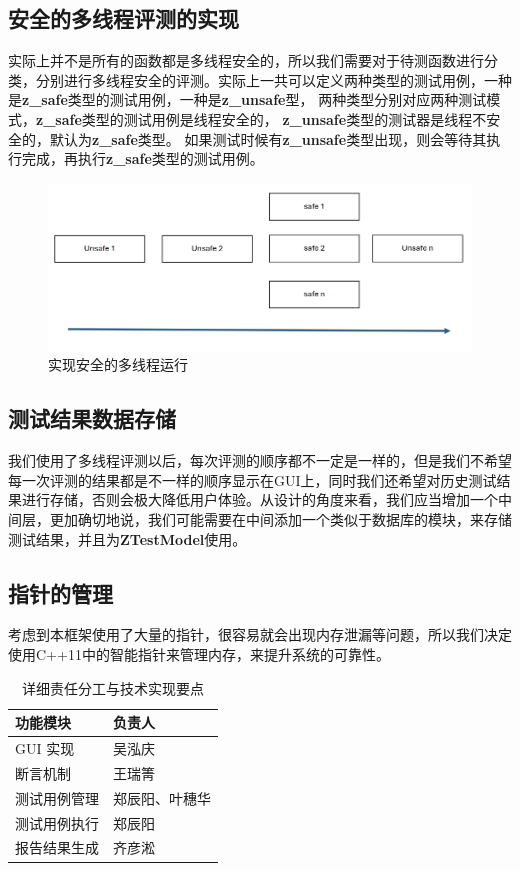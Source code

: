 \documentclass[chinese]{article}
\begin{document}
\subsection{安全的多线程评测的实现}
实际上并不是所有的函数都是多线程安全的，所以我们需要对于待测函数进行分类，分别进行多线程安全的评测。实际上一共可以定义两种类型的测试用例，一种是\textbf{z\_safe}类型的测试用例，一种是\textbf{z\_unsafe}型，
两种类型分别对应两种测试模式，\textbf{z\_safe}类型的测试用例是线程安全的，
\textbf{z\_unsafe}类型的测试器是线程不安全的，默认为\textbf{z\_safe}类型。
如果测试时候有\textbf{z\_unsafe}类型出现，则会等待其执行完成，再执行\textbf{z\_safe}类型的测试用例。
\begin{figure}[H]
    \centering
    \includegraphics[width=\textwidth]{img/run.png} %
    \caption{实现安全的多线程运行}
    \label{fig:diagram}
\end{figure}
\subsection{测试结果数据存储}
我们使用了多线程评测以后，每次评测的顺序都不一定是一样的，但是我们不希望每一次评测的结果都是不一样的顺序显示在GUI上，同时我们还希望对历史测试结果进行存储，否则会极大降低用户体验。从设计的角度来看，我们应当增加一个中间层，更加确切地说，我们可能需要在中间添加一个类似于数据库的模块，来存储测试结果，并且为\textbf{ZTestModel}使用。
\subsection{指针的管理}
考虑到本框架使用了大量的指针，很容易就会出现内存泄漏等问题，所以我们决定使用C++11中的智能指针来管理内存，来提升系统的可靠性。
\begin{table}[H]
    \centering
    \caption{详细责任分工与技术实现要点}
    \label{tab:division}
    \begin{tabularx}{\textwidth}{>{\centering\arraybackslash}m{3cm}>{\centering\arraybackslash}m{3cm}}
        \toprule
        \textbf{功能模块} & \textbf{负责人} \\
        \midrule
        GUI 实现        & 吴泓庆          \\
        断言机制          & 王瑞箐          \\
        测试用例管理        & 郑辰阳、叶穗华      \\
        测试用例执行        & 郑辰阳          \\
        报告结果生成        & 齐彦淞          \\
        \bottomrule
    \end{tabularx}
\end{table}
\end{document}

